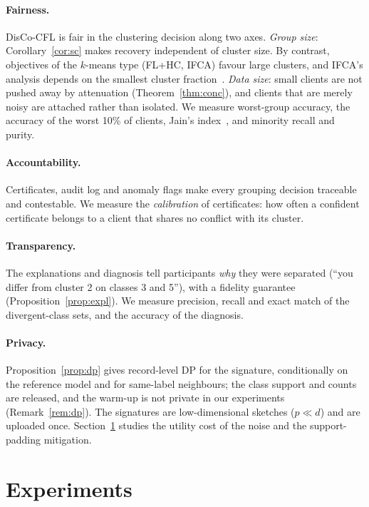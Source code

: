 \documentclass[11pt]{article}
\theoremstyle{definition}
\theoremstyle{remark}
\begin{document}
\paragraph{Fairness.} DisCo-CFL is fair in the clustering decision along two axes. \emph{Group size}: Corollary~\ref{cor:sc} makes recovery independent of cluster size. By contrast, objectives of the $k$-means type (FL+HC, IFCA) favour large clusters, and IFCA's analysis depends on the smallest cluster fraction~\citep{ghosh2020ifca}. \emph{Data size}: small clients are not pushed away by attenuation (Theorem~\ref{thm:conc}), and clients that are merely noisy are attached rather than isolated. We measure worst-group accuracy, the accuracy of the worst 10\% of clients, Jain's index~\citep{jain1984fairness}, and minority recall and purity.
\paragraph{Accountability.} Certificates, audit log and anomaly flags make every grouping decision traceable and contestable. We measure the \emph{calibration} of certificates: how often a confident certificate belongs to a client that shares no conflict with its cluster.
\paragraph{Transparency.} The explanations and diagnosis tell participants \emph{why} they were separated (``you differ from cluster 2 on classes 3 and 5''), with a fidelity guarantee (Proposition~\ref{prop:expl}). We measure precision, recall and exact match of the divergent-class sets, and the accuracy of the diagnosis.
\paragraph{Privacy.} Proposition~\ref{prop:dp} gives record-level DP for the signature, conditionally on the reference model and for same-label neighbours; the class support and counts are released, and the warm-up is not private in our experiments (Remark~\ref{rem:dp}). The signatures are low-dimensional sketches ($p\ll d$) and are uploaded once. Section~\ref{sec:exp} studies the utility cost of the noise and the support-padding mitigation.

\section{Experiments}\label{sec:exp}

\end{document}
